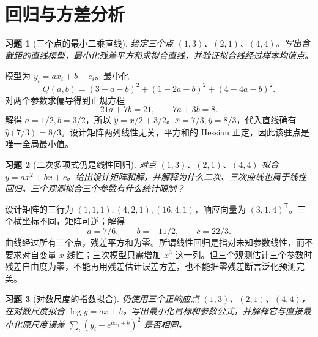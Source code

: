 \documentclass[12pt,fontset=fandol]{ctexart}
\newtheorem{exercise}{习题}[section]
\begin{document}
\clearpage\section{回归与方差分析}

\begin{exercise}[三个点的最小二乘直线]\label{q:M-C26-1a}
给定三个点 $(1,3)$、$(2,1)$、$(4,4)$。写出含截距的直线模型，最小化残差平方和求拟合直线，并验证拟合线经过样本均值点。\par{}
\end{exercise}

\begin{solve}\label{a:M-C26-1a}模型为 $y_i=a x_i+b+e_i$。最小化\[Q(a,b)=(3-a-b)^2+(1-2a-b)^2+(4-4a-b)^2.\]对两个参数求偏导得到正规方程\[21a+7b=21,\qquad7a+3b=8.\]解得 $a=1/2,b=3/2$，所以 $\widehat y=x/2+3/2$。$\overline x=7/3,\overline y=8/3$，代入直线确有 $\widehat y(7/3)=8/3$。设计矩阵两列线性无关，平方和的 Hessian 正定，因此该驻点是唯一全局最小值。\end{solve}

\begin{exercise}[二次多项式仍是线性回归]\label{q:M-C26-1b}
对点 $(1,3)$、$(2,1)$、$(4,4)$ 拟合 $y=ax^2+bx+c$。给出设计矩阵和解，并解释为什么二次、三次曲线也属于线性回归。三个观测拟合三个参数有什么统计限制？\par{}
\end{exercise}

\begin{solve}\label{a:M-C26-1b}设计矩阵的三行为 $(1,1,1),(4,2,1),(16,4,1)$，响应向量为 $(3,1,4)^\mathsf T$。三个横坐标不同，矩阵可逆；解得\[a=7/6,\qquad b=-11/2,\qquad c=22/3.\]曲线经过所有三个点，残差平方和为零。所谓线性回归是指对未知参数线性，而不要求对自变量 $x$ 线性；三次模型只需增加 $x^3$ 这一列。但三个观测估计三个参数时残差自由度为零，不能再用残差估计误差方差，也不能据零残差断言泛化预测完美。\end{solve}

\begin{exercise}[对数尺度的指数拟合]\label{q:M-C26-1c}
仍使用三个正响应点 $(1,3)$、$(2,1)$、$(4,4)$，在对数尺度拟合 $\log y=ax+b$。写出最小化目标和参数公式，并解释它与直接最小化原尺度误差 $\sum_i(y_i-e^{ax_i+b})^2$ 是否相同。\par{}
\end{exercise}
\end{document}
